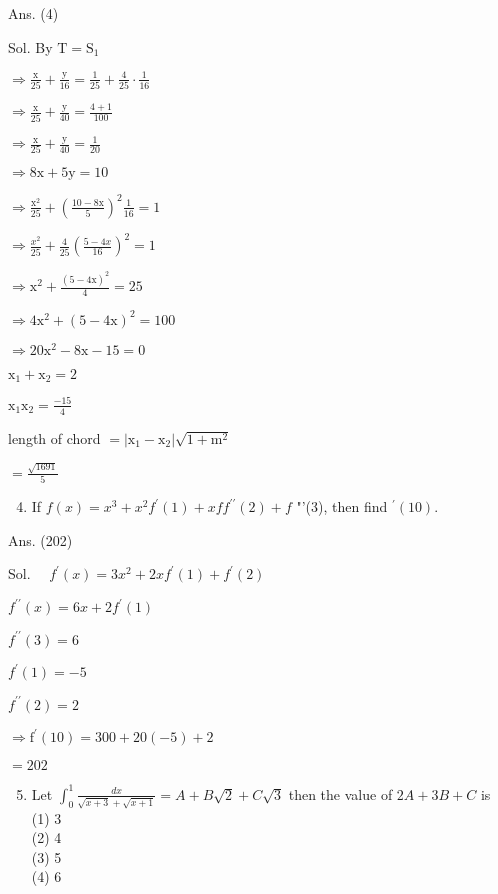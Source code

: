 \documentclass[10pt]{article}
\begin{document}
Ans. (4)

Sol. By $\mathrm{T}=\mathrm{S}_{1}$

$\Rightarrow \frac{\mathrm{x}}{25}+\frac{\mathrm{y}}{16}=\frac{1}{25}+\frac{4}{25} \cdot \frac{1}{16}$

$\Rightarrow \frac{\mathrm{x}}{25}+\frac{\mathrm{y}}{40}=\frac{4+1}{100}$

$\Rightarrow \frac{\mathrm{x}}{25}+\frac{\mathrm{y}}{40}=\frac{1}{20}$

$\Rightarrow 8 \mathrm{x}+5 \mathrm{y}=10$

$\Rightarrow \frac{\mathrm{x}^{2}}{25}+\left(\frac{10-8 \mathrm{x}}{5}\right)^{2} \frac{1}{16}=1$

$\Rightarrow \frac{x^{2}}{25}+\frac{4}{25}\left(\frac{5-4 x}{16}\right)^{2}=1$

$\Rightarrow \mathrm{x}^{2}+\frac{(5-4 \mathrm{x})^{2}}{4}=25$

$\Rightarrow 4 \mathrm{x}^{2}+(5-4 \mathrm{x})^{2}=100$

$\Rightarrow 20 \mathrm{x}^{2}-8 \mathrm{x}-15=0$

$\mathrm{x}_{1}+\mathrm{x}_{2}=2$

$\mathrm{x}_{1} \mathrm{x}_{2}=\frac{-15}{4}$

length of chord $=\left|\mathrm{x}_{1}-\mathrm{x}_{2}\right| \sqrt{1+\mathrm{m}^{2}}$

$=\frac{\sqrt{1691}}{5}$

\begin{enumerate}
  \setcounter{enumi}{3}
  \item If $f(x)=x^{3}+x^{2} f^{\prime}(1)+x f f^{\prime \prime}(2)+f$ "'(3), then find $^{\prime}(10)$.
\end{enumerate}

Ans. (202)

Sol. $\quad f^{\prime}(x)=3 x^{2}+2 x f^{\prime}(1)+f^{\prime}(2)$

$f^{\prime \prime}(x)=6 x+2 f^{\prime}(1)$

$f^{\prime \prime}(3)=6$

$f^{\prime}(1)=-5$

$f^{\prime \prime}(2)=2$

$\Rightarrow \mathrm{f}^{\prime}(10)=300+20(-5)+2$

$=202$

\begin{enumerate}
  \setcounter{enumi}{4}
  \item Let $\int_{0}^{1} \frac{d x}{\sqrt{x+3}+\sqrt{x+1}}=A+B \sqrt{2}+C \sqrt{3}$ then the value of $2 A+3 B+C$ is\\
(1) 3\\
(2) 4\\
(3) 5\\
(4) 6
\end{enumerate}
\end{document}
